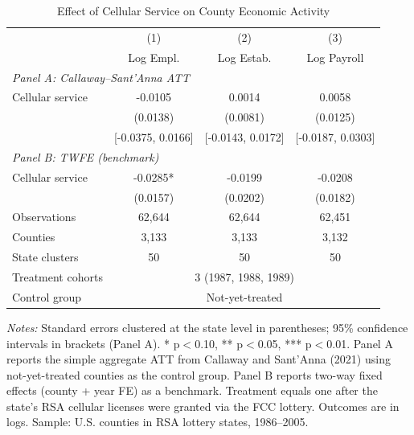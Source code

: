 \begin{table}[H]
\centering
\caption{Effect of Cellular Service on County Economic Activity}
\begin{threeparttable}
\begin{tabular}{lccc}
\toprule
 & (1) & (2) & (3) \\
 & Log Empl. & Log Estab. & Log Payroll \\
\midrule
\multicolumn{4}{l}{\textit{Panel A: Callaway--Sant'Anna ATT}} \\[3pt]
Cellular service & -0.0105 & 0.0014 & 0.0058 \\
 & (0.0138) & (0.0081) & (0.0125) \\
 & [-0.0375, 0.0166] & [-0.0143, 0.0172] & [-0.0187, 0.0303] \\[6pt]
\multicolumn{4}{l}{\textit{Panel B: TWFE (benchmark)}} \\[3pt]
Cellular service & -0.0285* & -0.0199 & -0.0208 \\
 & (0.0157) & (0.0202) & (0.0182) \\[6pt]
\midrule
Observations & 62,644 & 62,644 & 62,451 \\
Counties & 3,133 & 3,133 & 3,132 \\
State clusters & 50 & 50 & 50 \\
Treatment cohorts & \multicolumn{3}{c}{3 (1987, 1988, 1989)} \\
Control group & \multicolumn{3}{c}{Not-yet-treated} \\
\bottomrule
\end{tabular}
\begin{tablenotes}[flushleft]
\small
\item \textit{Notes:} Standard errors clustered at the state level in parentheses; 95\% confidence intervals in brackets (Panel A). * p$<$0.10, ** p$<$0.05, *** p$<$0.01. Panel A reports the simple aggregate ATT from Callaway and Sant'Anna (2021) using not-yet-treated counties as the control group. Panel B reports two-way fixed effects (county + year FE) as a benchmark. Treatment equals one after the state's RSA cellular licenses were granted via the FCC lottery. Outcomes are in logs. Sample: U.S. counties in RSA lottery states, 1986--2005.
\end{tablenotes}
\end{threeparttable}
\label{tab:main}
\end{table}
